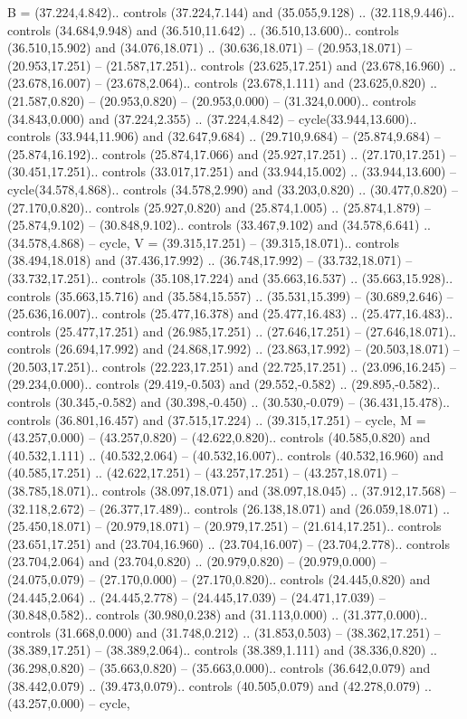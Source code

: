 {B} = {(37.224,4.842).. controls (37.224,7.144) and (35.055,9.128) .. (32.118,9.446).. controls (34.684,9.948) and (36.510,11.642) .. (36.510,13.600).. controls (36.510,15.902) and (34.076,18.071) .. (30.636,18.071) -- (20.953,18.071) -- (20.953,17.251) -- (21.587,17.251).. controls (23.625,17.251) and (23.678,16.960) .. (23.678,16.007) -- (23.678,2.064).. controls (23.678,1.111) and (23.625,0.820) .. (21.587,0.820) -- (20.953,0.820) -- (20.953,0.000) -- (31.324,0.000).. controls (34.843,0.000) and (37.224,2.355) .. (37.224,4.842) -- cycle(33.944,13.600).. controls (33.944,11.906) and (32.647,9.684) .. (29.710,9.684) -- (25.874,9.684) -- (25.874,16.192).. controls (25.874,17.066) and (25.927,17.251) .. (27.170,17.251) -- (30.451,17.251).. controls (33.017,17.251) and (33.944,15.002) .. (33.944,13.600) -- cycle(34.578,4.868).. controls (34.578,2.990) and (33.203,0.820) .. (30.477,0.820) -- (27.170,0.820).. controls (25.927,0.820) and (25.874,1.005) .. (25.874,1.879) -- (25.874,9.102) -- (30.848,9.102).. controls (33.467,9.102) and (34.578,6.641) .. (34.578,4.868) -- cycle},
{V} = {(39.315,17.251) -- (39.315,18.071).. controls (38.494,18.018) and (37.436,17.992) .. (36.748,17.992) -- (33.732,18.071) -- (33.732,17.251).. controls (35.108,17.224) and (35.663,16.537) .. (35.663,15.928).. controls (35.663,15.716) and (35.584,15.557) .. (35.531,15.399) -- (30.689,2.646) -- (25.636,16.007).. controls (25.477,16.378) and (25.477,16.483) .. (25.477,16.483).. controls (25.477,17.251) and (26.985,17.251) .. (27.646,17.251) -- (27.646,18.071).. controls (26.694,17.992) and (24.868,17.992) .. (23.863,17.992) -- (20.503,18.071) -- (20.503,17.251).. controls (22.223,17.251) and (22.725,17.251) .. (23.096,16.245) -- (29.234,0.000).. controls (29.419,-0.503) and (29.552,-0.582) .. (29.895,-0.582).. controls (30.345,-0.582) and (30.398,-0.450) .. (30.530,-0.079) -- (36.431,15.478).. controls (36.801,16.457) and (37.515,17.224) .. (39.315,17.251) -- cycle},
{M} = {(43.257,0.000) -- (43.257,0.820) -- (42.622,0.820).. controls (40.585,0.820) and (40.532,1.111) .. (40.532,2.064) -- (40.532,16.007).. controls (40.532,16.960) and (40.585,17.251) .. (42.622,17.251) -- (43.257,17.251) -- (43.257,18.071) -- (38.785,18.071).. controls (38.097,18.071) and (38.097,18.045) .. (37.912,17.568) -- (32.118,2.672) -- (26.377,17.489).. controls (26.138,18.071) and (26.059,18.071) .. (25.450,18.071) -- (20.979,18.071) -- (20.979,17.251) -- (21.614,17.251).. controls (23.651,17.251) and (23.704,16.960) .. (23.704,16.007) -- (23.704,2.778).. controls (23.704,2.064) and (23.704,0.820) .. (20.979,0.820) -- (20.979,0.000) -- (24.075,0.079) -- (27.170,0.000) -- (27.170,0.820).. controls (24.445,0.820) and (24.445,2.064) .. (24.445,2.778) -- (24.445,17.039) -- (24.471,17.039) -- (30.848,0.582).. controls (30.980,0.238) and (31.113,0.000) .. (31.377,0.000).. controls (31.668,0.000) and (31.748,0.212) .. (31.853,0.503) -- (38.362,17.251) -- (38.389,17.251) -- (38.389,2.064).. controls (38.389,1.111) and (38.336,0.820) .. (36.298,0.820) -- (35.663,0.820) -- (35.663,0.000).. controls (36.642,0.079) and (38.442,0.079) .. (39.473,0.079).. controls (40.505,0.079) and (42.278,0.079) .. (43.257,0.000) -- cycle},
